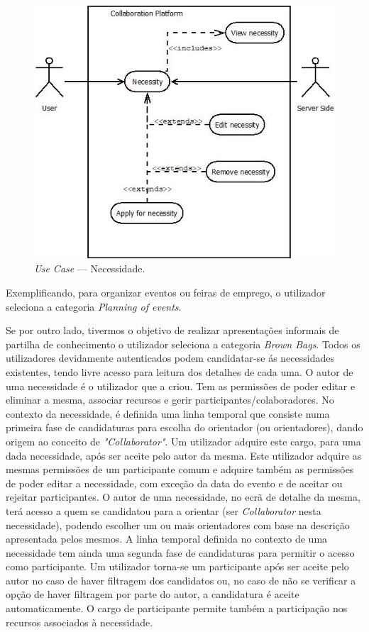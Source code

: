 \begin{figure}[H]
    \centering
    \includegraphics[scale=0.6]{figures/Necessity.jpeg}
    \caption{\textit{Use Case} --- Necessidade.}\label{fig:uc:necessity}
\end{figure}

Exemplificando, para organizar eventos ou feiras de emprego, o utilizador seleciona a categoria \textit{Planning of events}.

Se por outro lado, tivermos o objetivo de realizar apresentações informais de partilha de conhecimento o utilizador seleciona a categoria \textit{Brown Bags}. 
Todos os utilizadores devidamente autenticados podem candidatar-se ás necessidades existentes, tendo livre acesso para leitura dos detalhes de cada uma. 
O autor de uma necessidade é o utilizador que a criou. Tem as permissões de poder editar e eliminar a mesma, associar recursos e gerir participantes/colaboradores.
No contexto da necessidade, é definida uma linha temporal que consiste numa primeira fase de candidaturas para escolha do orientador 
(ou orientadores), dando origem ao conceito de \textit{"Collaborator"}. 
Um utilizador adquire este cargo, para uma dada necessidade, após ser aceite pelo autor da mesma. Este utilizador adquire as mesmas permissões de um participante comum e adquire também as permissões de poder editar a necessidade, com exceção da data do evento e de aceitar ou rejeitar participantes. 
O autor de uma necessidade, no ecrã de detalhe da mesma, terá acesso a quem se candidatou para a orientar (ser \textit{Collaborator} nesta necessidade), podendo escolher um ou mais orientadores 
com base na descrição apresentada pelos mesmos. 
A linha temporal definida no contexto de uma necessidade tem ainda uma segunda fase de candidaturas para permitir o acesso como participante. 
Um utilizador torna-se um participante após ser aceite pelo autor no caso de haver filtragem dos candidatos ou, no caso de não se verificar a opção de haver filtragem por parte do autor, a candidatura é aceite automaticamente. O cargo de participante permite também a participação nos recursos associados à necessidade.

